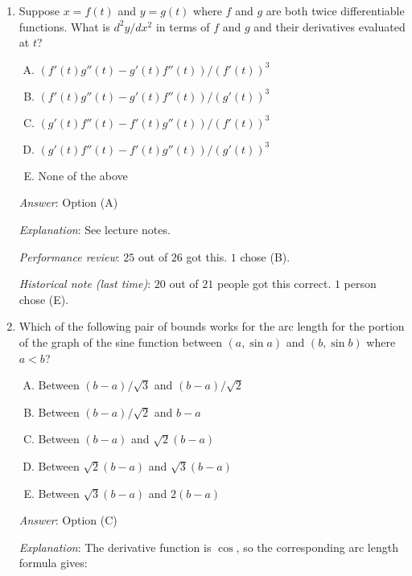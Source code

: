\documentclass[10pt]{amsart}
\begin{document}
\begin{enumerate}
  {\em Performance review}: $25$ out of $26$ got this. $1$ chose (A).

  {\em Historical note (last time)}: $20$ out of $21$ people got this
  correct. $1$ person left the question blank.

  {\em Historical note}: I put this question in a quiz for Math 152
  back in October 2010, and $14$ of $14$ people who took that
  quiz got it correct.
\item Suppose $x = f(t)$ and $y = g(t)$ where $f$ and $g$ are both
  twice differentiable functions. What is $d^2y/dx^2$ in terms of $f$
  and $g$ and their derivatives evaluated at $t$?

  \begin{enumerate}[(A)]
  \item $(f'(t)g''(t) - g'(t)f''(t))/(f'(t))^3$
  \item $(f'(t)g''(t) - g'(t)f''(t))/(g'(t))^3$
  \item $(g'(t)f''(t) - f'(t)g''(t))/(f'(t))^3$
  \item $(g'(t)f''(t) - f'(t)g''(t))/(g'(t))^3$
  \item None of the above
  \end{enumerate}

  {\em Answer}: Option (A)

  {\em Explanation}: See lecture notes.

  {\em Performance review}: $25$ out of $26$ got this. $1$ chose (B).

  {\em Historical note (last time)}: $20$ out of $21$ people got this
  correct. $1$ person chose (E).
\item Which of the following pair of bounds works for the arc length
  for the portion of the graph of the sine function between $(a,\sin
  a)$ and $(b, \sin b)$ where $a < b$?

  \begin{enumerate}[(A)]
  \item Between $(b - a)/\sqrt{3}$ and $(b - a)/\sqrt{2}$
  \item Between $(b - a)/\sqrt{2}$ and $b - a$
  \item Between $(b - a)$ and $\sqrt{2}(b - a)$
  \item Between $\sqrt{2}(b - a)$ and $\sqrt{3}(b - a)$
  \item Between $\sqrt{3}(b - a)$ and $2(b - a)$
  \end{enumerate}

  {\em Answer}: Option (C)

  {\em Explanation}: The derivative function is $\cos$, so the
  corresponding arc length formula gives:


\end{enumerate}
\end{document}
